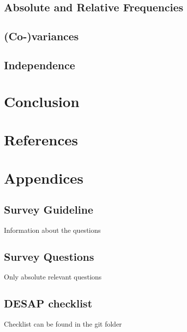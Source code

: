 \documentclass[12pt,a4paper,paper=a4,oneside,titlepage,pdftex]{scrartcl}
\begin{document}
\subsection{Absolute and Relative Frequencies}

\subsection{(Co-)variances}

\subsection{Independence}

\section{Conclusion}

\section*{References}

\renewcommand\refname{\vskip -1cm}


\section*{Appendices}

\subsection*{Survey Guideline}
Information about the questions

\subsection*{Survey Questions}
Only absolute relevant questions

\subsection*{DESAP checklist}
Checklist can be found in the git folder
\end{document}

